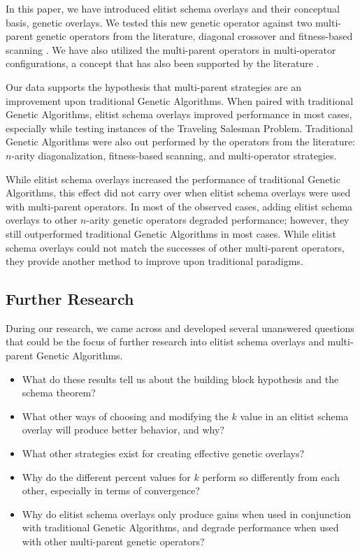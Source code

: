 In this paper, we have introduced elitist schema overlays and their conceptual basis, genetic overlays. We tested this new genetic operator against two multi-parent genetic operators from the literature, diagonal crossover and fitness-based scanning \cite{Eiben94}. We have also utilized the multi-parent operators in multi-operator configurations, a concept that has also been supported by the literature \cite{Smith04}.

Our data supports the hypothesis that multi-parent strategies are an improvement upon traditional Genetic Algorithms. When paired with traditional Genetic Algorithms, elitist schema overlays improved performance in most cases, especially while testing instances of the Traveling Salesman Problem. Traditional Genetic Algorithms were also out performed by the operators from the literature: $n$-arity diagonalization, fitness-based scanning, and multi-operator strategies. 

While elitist schema overlays increased the performance of traditional Genetic Algorithms, this effect did not carry over when elitist schema overlays were used with multi-parent operators. In most of the observed cases, adding elitist schema overlays to other $n$-arity genetic operators degraded performance; however, they still outperformed traditional Genetic Algorithms in most cases. While elitist schema overlays could not match the successes of other multi-parent operators, they provide another method to improve upon traditional paradigms.

\subsection*{Further Research}
During our research, we came across and developed several unanswered questions that could be the focus of further research into elitist schema overlays and multi-parent Genetic Algorithms. 

\begin{itemize}
\item What do these results tell us about the building block hypothesis and the schema theorem?

\item What other ways of choosing and modifying the $k$ value in an elitist schema overlay will produce better behavior, and why?

\item What other strategies exist for creating effective genetic overlays?

\item Why do the different percent values for $k$ perform so differently from each other, especially in terms of convergence?

\item Why do elitist schema overlays only produce gains when used in conjunction with traditional Genetic Algorithms, and degrade performance when used with other multi-parent genetic operators?
\end{itemize}